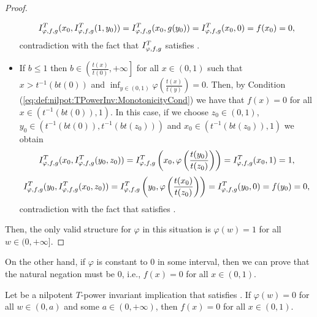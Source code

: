 \begin{proof}
\begin{itemize}
		$$I^T_{\varphi,f,g}(x_0,I^T_{\varphi,f,g}(1,y_0))=I^T_{\varphi,f,g}(x_0,g(y_0))=I^T_{\varphi,f,g}(x_0,0)=f(x_0)=0,$$
		contradiction with the fact that $I^T_{\varphi,f,g}$ satisfies \EP.
		\item If $b \leq 1$ then $b \in \left( \frac{t(x)}{t(0)},+\infty\right]$ for all $x \in (0,1)$ such that $x>t^{-1}(bt(0))$ and $\displaystyle \inf_{y \in (0,1)} \varphi \left(\frac{t(x)}{t(y)}\right)=0$. Then, by Condition (\ref{eq:def:nilpot:TPowerInv:MonotonicityCond}) we have that $f(x)=0$ for all $x \in (t^{-1}(bt(0)),1)$. In this case, if we choose $z_0 \in (0,1)$, $y_0 \in (t^{-1}(bt(0)),t^{-1}(bt(z_0)))$ and $x_0 \in (t^{-1}(bt(z_0)),1)$ we obtain
		$$I^T_{\varphi,f,g}(x_0,I^T_{\varphi,f,g}(y_0,z_0)) = I^T_{\varphi,f,g} \left(x_0,\varphi \left(\frac{t(y_0)}{t(z_0)}\right)\right) = I^T_{\varphi,f,g}(x_0,1)=1,$$
		$$I^T_{\varphi,f,g}(y_0,I^T_{\varphi,f,g}(x_0,z_0)) = I^T_{\varphi,f,g} \left(y_0,\varphi \left(\frac{t(x_0)}{t(z_0)}\right)\right) = I^T_{\varphi,f,g}(y_0,0)=f(y_0)=0,$$
		contradiction with the fact that \IT satisfies \EP.
	\end{itemize}
	Then, the only valid structure for $\varphi$ in this situation is $\varphi(w)=1$ for all $w \in (0,+\infty]$.
\end{proof}

On the other hand, if $\varphi$ is constant to $0$ in some interval, then we can prove that the natural negation must be 0, i.e., $f(x)=0$ for all $x \in (0,1)$.

\begin{lemma}\label{lem:nilpotent:(EP)ConstantZone0f(x)}
	Let \IT be a nilpotent $T$-power invariant implication that satisfies \EP. If $\varphi(w)=0$ for all $w \in (0,a)$ and some $a \in (0,+\infty)$, then $f(x)=0$ for all $x \in (0,1)$.
\end{lemma}

